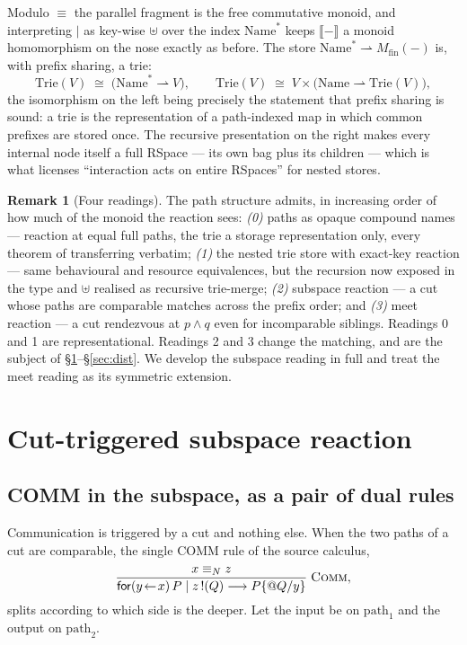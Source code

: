 \documentclass[11pt]{article}
\makeatletter
\theoremstyle{plain}
\theoremstyle{definition}
\newtheorem{remark}{Remark}
\newcommand{\den}[1]{\llbracket #1 \rrbracket}
\newcommand{\Name}{\mathrm{Name}}
\newcommand{\Mfin}{M_{\mathrm{fin}}}
\newcommand{\rfor}[2]{\mathsf{for}(#1\!\leftarrow\!#2)\,}
\newcommand{\rout}[2]{#1\,!(#2)}
\newcommand{\quo}{@}
\newcommand{\rr}{\rightharpoonup}
\makeatother
\begin{document}
Modulo $\equiv$ the parallel fragment is the free commutative monoid, and interpreting $\mid$ as
key-wise $\uplus$ over the index $\Name^{\ast}$ keeps $\den{-}$ a monoid homomorphism on the nose
exactly as before. The store $\Name^{\ast}\rr\Mfin(-)$ is, with prefix sharing, a trie:
\[
  \mathrm{Trie}(V)\;\cong\;\bigl(\Name^{\ast}\rr V\bigr),
  \qquad
  \mathrm{Trie}(V)\;\cong\;V\times\bigl(\Name\rr\mathrm{Trie}(V)\bigr),
\]
the isomorphism on the left being precisely the statement that prefix sharing is sound: a trie is the
representation of a path-indexed map in which common prefixes are stored once. The recursive
presentation on the right makes every internal node itself a full RSpace --- its own bag plus its
children --- which is what licenses ``interaction acts on entire RSpaces'' for nested stores.

\begin{remark}[Four readings]
The path structure admits, in increasing order of how much of the monoid the reaction sees:
\emph{(0)} paths as opaque compound names --- reaction at equal full paths, the trie a storage
representation only, every theorem of \cite{KnotRho} transferring verbatim; \emph{(1)} the nested
trie store with exact-key reaction --- same behavioural and resource equivalences, but the recursion
now exposed in the type and $\uplus$ realised as recursive trie-merge; \emph{(2)} subspace reaction
--- a cut whose paths are comparable matches across the prefix order; and \emph{(3)} meet reaction
--- a cut rendezvous at $p\wedge q$ even for incomparable siblings. Readings 0 and 1 are
representational. Readings 2 and 3 change the matching, and are the subject of
\S\ref{sec:subspace}--\S\ref{sec:dist}. We develop the subspace reading in full and treat the meet
reading as its symmetric extension.
\end{remark}

\section{Cut-triggered subspace reaction}\label{sec:subspace}

\subsection{COMM in the subspace, as a pair of dual rules}

Communication is triggered by a cut and nothing else. When the two paths of a cut are comparable, the
single COMM rule of the source calculus,
\[
  \frac{x\equiv_{N}z}{\rfor{y}{x}P \mid \rout{z}{Q} \longrightarrow P\{\quo Q/y\}}\;\textsc{Comm},
\]
splits according to which side is the deeper. Let the input be on $\mathrm{path}_1$ and the output on
$\mathrm{path}_2$.
\end{document}

